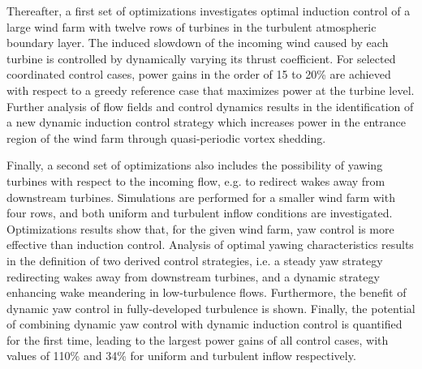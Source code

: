 Thereafter, a first set of optimizations investigates optimal induction control of a large wind farm with twelve rows of turbines in the turbulent atmospheric boundary layer. The induced slowdown of the incoming wind caused by each turbine is controlled by dynamically varying its thrust coefficient. For selected coordinated control cases, power gains in the order of 15 to 20\% are achieved with respect to a greedy reference case that maximizes power at the turbine level. Further analysis of flow fields and control dynamics results in the identification of a new dynamic induction control strategy which increases power in the entrance region of the wind farm through quasi-periodic vortex shedding. 

Finally, a second set of optimizations also includes the possibility of yawing turbines with respect to the incoming flow, e.g. to redirect wakes away from downstream turbines. Simulations are performed for a smaller wind farm with four rows, and both uniform and turbulent inflow conditions are investigated. Optimizations results show that, for the given wind farm, yaw control is more effective than induction control. Analysis of optimal yawing characteristics results in the definition of two derived control strategies, i.e. a steady yaw strategy redirecting wakes away from downstream turbines, and a dynamic strategy enhancing wake meandering in low-turbulence flows. Furthermore, the benefit of dynamic yaw control in fully-developed turbulence is shown. Finally, the potential of combining dynamic yaw control with dynamic induction control is quantified for the first time, leading to the largest power gains of all control cases, with values of 110\% and 34\% for uniform and turbulent inflow respectively. 



\cleardoublepage

